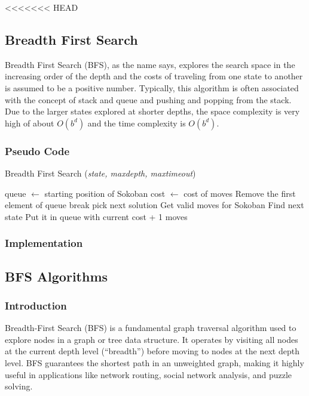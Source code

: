 <<<<<<< HEAD
\subsection{Breadth First Search}
\noindent Breadth First Search (BFS), as the name says, explores the search space in the increasing order of the depth and the costs of traveling from one state to another is assumed to be a positive number. Typically, this algorithm is often associated with the concept of stack and queue and pushing and popping from the stack. Due to the larger states explored at shorter depths, the space complexity is very high of about $O(b^d)$ and the time complexity is $O(b^d)$.

\subsubsection{Pseudo Code}
\begin{algorithm}[H]
	\caption{Breadth First Search (\textit{state, maxdepth, maxtimeout})}
	\label{alg:bfs}
	\begin{algorithmic}[1]
	\State queue $\gets$ starting position of Sokoban
	\State cost $\gets$ cost of moves
		\State Remove the first element of queue
			\State break
		\Else
				\State pick next solution
			\Else
				\State Get valid moves for Sokoban
					\State Find next state
					\State Put it in queue with current cost + 1
				\EndFor
			\EndIf
		\EndIf
	\EndWhile
	\State \Return moves
	\end{algorithmic}
\end{algorithm}

\subsubsection{Implementation}

\subsection{BFS Algorithms}
\subsubsection{Introduction}
Breadth-First Search (BFS) is a fundamental graph traversal algorithm used to explore nodes in a graph or tree data structure. It operates by visiting all nodes at the current depth level (``breadth'') before moving to nodes at the next depth level. BFS guarantees the shortest path in an unweighted graph, making it highly useful in applications like network routing, social network analysis, and puzzle solving.

